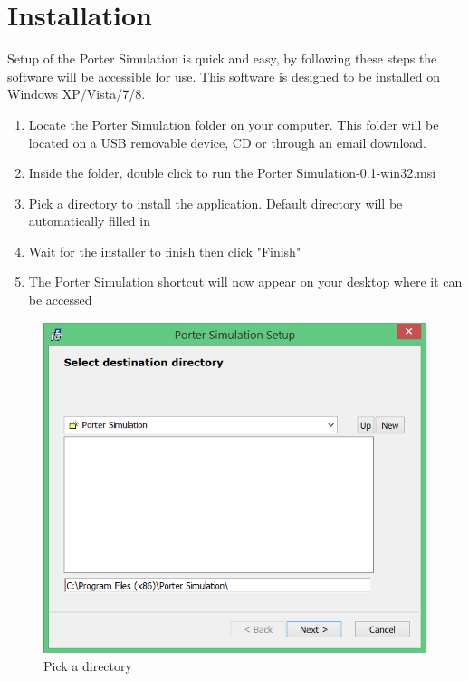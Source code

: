 \documentclass[paper=letter, fontsize=10pt]{scrartcl}
\numberwithin{equation}{section}		%
\numberwithin{figure}{section}			%
\numberwithin{table}{section}				%
\begin{document}
\section{Installation}
Setup of the Porter Simulation is quick and easy, by following these steps the software will be accessible for use.  This software is designed to be installed on Windows XP/Vista/7/8.
\begin{enumerate}
	\item Locate the Porter Simulation folder on your computer. This folder will be located on a USB removable device, CD or through an email download.
	\item Inside the folder, double click to run the Porter Simulation-0.1-win32.msi
	\item Pick a directory to install the application. Default directory will be automatically filled in
	\item Wait for the installer to finish then click "Finish"
	\item The Porter Simulation shortcut will now appear on your desktop where it can be accessed
\end{enumerate}

\begin{figure}[!htbp]
	\begin{center}
		\includegraphics[width=1\columnwidth, height=0.5\textheight, keepaspectratio]{Installer.png}
		\caption{Pick a directory}
	\end{center}
\end{figure}
\end{document}

